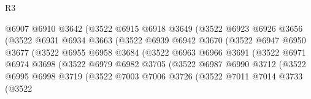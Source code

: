 \begin{lexlean}{R3}
\begin{coremodule}
                            @6907
                            @6910
                            @3642
                            (@3522
                              @6915
                              @6918
                              @3649
                              (@3522
                                @6923
                                @6926
                                @3656
                                (@3522
                                  @6931
                                  @6934
                                  @3663
                                  (@3522
                                    @6939
                                    @6942
                                    @3670
                                    (@3522
                                      @6947
                                      @6950
                                      @3677
                                      (@3522
                                        @6955
                                        @6958
                                        @3684
                                        (@3522
                                          @6963
                                          @6966
                                          @3691
                                          (@3522
                                            @6971
                                            @6974
                                            @3698
                                            (@3522
                                              @6979
                                              @6982
                                              @3705
                                              (@3522
                                                @6987
                                                @6990
                                                @3712
                                                (@3522
                                                  @6995
                                                  @6998
                                                  @3719
                                                  (@3522
                                                    @7003
                                                    @7006
                                                    @3726
                                                    (@3522
                                                      @7011
                                                      @7014
                                                      @3733
                                                      (@3522

\end{coremodule}
\end{lexlean}

